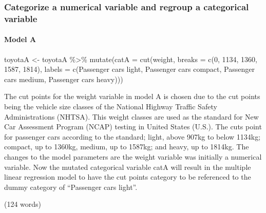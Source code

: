 \documentclass[
]{article}
\newenvironment{Shaded}{\begin{snugshade}}{\end{snugshade}}
\newcommand{\AttributeTok}[1]{\textcolor[rgb]{0.77,0.63,0.00}{#1}}
\newcommand{\DecValTok}[1]{\textcolor[rgb]{0.00,0.00,0.81}{#1}}
\newcommand{\FunctionTok}[1]{\textcolor[rgb]{0.00,0.00,0.00}{#1}}
\newcommand{\NormalTok}[1]{#1}
\newcommand{\OtherTok}[1]{\textcolor[rgb]{0.56,0.35,0.01}{#1}}
\newcommand{\SpecialCharTok}[1]{\textcolor[rgb]{0.00,0.00,0.00}{#1}}
\newcommand{\StringTok}[1]{\textcolor[rgb]{0.31,0.60,0.02}{#1}}
\begin{document}
\hypertarget{categorize-a-numerical-variable-and-regroup-a-categorical-variable}{%
\subsubsection{Categorize a numerical variable and regroup a categorical
variable}\label{categorize-a-numerical-variable-and-regroup-a-categorical-variable}}

\hypertarget{model-a-3}{%
\paragraph{Model A}\label{model-a-3}}

\begin{Shaded}
\begin{Highlighting}[]
\NormalTok{toyotaA }\OtherTok{\textless{}{-}}\NormalTok{ toyotaA }\SpecialCharTok{\%\textgreater{}\%}
  \FunctionTok{mutate}\NormalTok{(}\AttributeTok{catA =} \FunctionTok{cut}\NormalTok{(weight,}
                    \AttributeTok{breaks =} \FunctionTok{c}\NormalTok{(}\DecValTok{0}\NormalTok{, }\DecValTok{1134}\NormalTok{, }\DecValTok{1360}\NormalTok{, }\DecValTok{1587}\NormalTok{, }\DecValTok{1814}\NormalTok{),}
                    \AttributeTok{labels =} \FunctionTok{c}\NormalTok{(}\StringTok{\textquotesingle{}Passenger cars light\textquotesingle{}}\NormalTok{, }\StringTok{\textquotesingle{}Passenger cars compact\textquotesingle{}}\NormalTok{, }\StringTok{\textquotesingle{}Passenger cars medium\textquotesingle{}}\NormalTok{, }\StringTok{\textquotesingle{}Passenger cars heavy\textquotesingle{}}\NormalTok{)))}
\end{Highlighting}
\end{Shaded}

The cut points for the weight variable in model A is chosen due to the
cut points being the vehicle size classes of the National Highway
Traffic Safety Administrations (NHTSA). This weight classes are used as
the standard for New Car Assessment Program (NCAP) testing in United
States (U.S.). The cuts point for passenger cars according to the
standard; light, above 907kg to below 1134kg; compact, up to 1360kg,
medium, up to 1587kg; and heavy, up to 1814kg. The changes to the model
parameters are the weight variable was initially a numerical variable.
Now the mutated categorical variable catA will result in the multiple
linear regression model to have the cut points category to be referenced
to the dummy category of ``Passenger cars light''.

(124 words)
\end{document}
